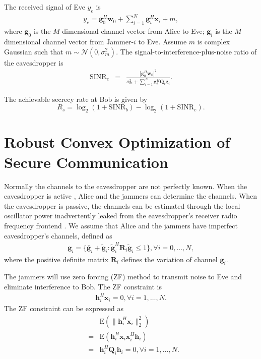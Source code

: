 \documentclass[12pt, journal,onecolumn,draftclsnofoot]{IEEEtran}
\begin{document}
The received signal of Eve $y_e$ is
\begin{eqnarray}
y_e = \mathbf{g}_0^H\mathbf{w}_0 + \sum_{i = 1}^N\mathbf{g}_i^H\mathbf{x}_i + m,
\end{eqnarray}
where $\mathbf{g}_0$ is the $M$ dimensional channel vector from Alice to Eve; $\mathbf{g}_i$ is the $M$ dimensional channel vector from Jammer-$i$ to Eve.   Assume $m$ is complex Gaussian such that $m \sim \mathcal{N}(0,\sigma_m^2)$.
The signal-to-interference-plus-noise ratio of the eavesdropper is
\begin{eqnarray}
\mathrm{SINR}_e &=& \frac{\left| \mathbf{g}_{0}^H\mathbf{w}_{0}\right|^2}{\sigma_m^2 + \sum_{i=1}^{N}\mathbf{g}_{i}^H\mathbf{Q}_{i}\mathbf{g}_i} \label{eq:secure_capacity}.
\end{eqnarray}

The achievable secrecy rate at Bob is given by \cite{6728676}
\begin{equation}
R_s = \log_2\left(1 + \mathrm{SINR}_b\right)-\log_2\left(1 + \mathrm{SINR}_e\right).
\end{equation}


\section{Robust Convex Optimization of Secure Communication} \label{sec:robust programming}
Normally the channels to the eavesdropper are not perfectly known. When the eavesdropper is active \cite{gopala2008secrecy,feng_miso}, Alice and the jammers can determine the channels. When the eavesdropper is passive, the channels can be estimated through the local oscillator power inadvertently leaked from the eavesdropper's receiver radio frequency frontend \cite{mukherjee2012detecting,feng_miso}. We assume that  Alice and the jammers have imperfect eavesdropper's channels, defined as 
\begin{eqnarray}
\mathbf{g}_i = \{\bar{\mathbf{g}}_i + \tilde{\mathbf{g}}_i: \tilde{\mathbf{g}}_i^H \mathbf{R}_i\tilde{\mathbf{g}}_i \leq 1\},\forall i = 0,\ldots, N,
\end{eqnarray}
where the positive definite  matrix $\mathbf{R}_i $ defines the variation of channel $\mathbf{g}_i$. 

The jammers will use zero forcing (ZF) method to transmit noise to Eve and eliminate interference to Bob.
The ZF constraint is 
\begin{eqnarray}
\mathbf{h}_i^H\mathbf{x}_i =0 , \forall i = 1,\dots, N\label{eq:ZF_constraint}.
\end{eqnarray}
The ZF constraint can be expressed as
\begin{eqnarray}
&&\mathrm{E}(\|\mathbf{h}_i^H\mathbf{x}_i\|_2^2)\nonumber\\
&=&\mathrm{E}(\mathbf{h}_i^H\mathbf{x}_i\mathbf{x}_i^H\mathbf{h}_i)\nonumber\\
&=&\mathbf{h}_i^H\mathbf{Q}_i \mathbf{h}_i = 0, \forall i = 1,\ldots,N \label{eq:ZF_constraint_relaxed}.
\end{eqnarray}
\end{document}

